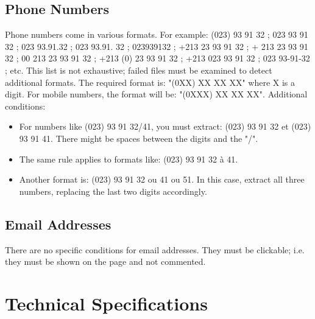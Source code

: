 \documentclass{../../../extra/aakpract/aakpract}
\begin{document}
\subsection{Phone Numbers}

Phone numbers come in various formats. For example: (023) 93 91 32 ; 023 93 91 32 ; 023 93.91.32 ; 023 93.91. 32 ; 023939132 ;
+213 23 93 91 32 ; + 213 23 93 91 32 ; 00 213 23 93 91 32 ; +213 (0) 23 93 91 32 ; +213 023 93 91 32 ; 023 93-91-32 ; etc.
This list is not exhaustive; failed files must be examined to detect additional formats.
The required format is: "(0XX) XX XX XX" where X is a digit.
For mobile numbers, the format will be: "(0XXX) XX XX XX".
Additional conditions:
\begin{itemize}
	\item For numbers like (023) 93 91 32/41, you must extract: (023) 93 91 32 et (023) 93 91 41. 
	There might be spaces between the digits and the "/".
	\item The same rule applies to formats like: (023) 93 91 32 à 41.
	\item Another format is: (023) 93 91 32 ou 41 ou 51. 
	In this case, extract all three numbers, replacing the last two digits accordingly.
\end{itemize}

\subsection{Email Addresses}

There are no specific conditions for email addresses.
They must be clickable; i.e. they must be shown on the page and not commented.

\section{Technical Specifications}
\end{document}
